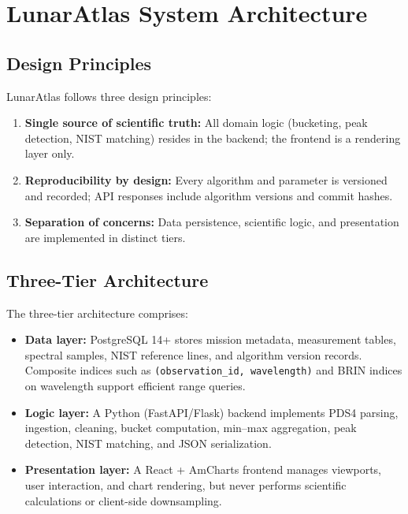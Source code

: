 \documentclass[12pt,a4paper]{article}
\begin{document}
\section{LunarAtlas System Architecture}
\label{sec:architecture}

\subsection{Design Principles}

LunarAtlas follows three design principles:

\begin{enumerate}[nosep]
  \item \textbf{Single source of scientific truth:} All domain logic (bucketing, peak detection, NIST matching) resides in the backend; the frontend is a rendering layer only.
  \item \textbf{Reproducibility by design:} Every algorithm and parameter is versioned and recorded; API responses include algorithm versions and commit hashes.
  \item \textbf{Separation of concerns:} Data persistence, scientific logic, and presentation are implemented in distinct tiers.
\end{enumerate}

\subsection{Three-Tier Architecture}

The three-tier architecture comprises:

\begin{itemize}[nosep]
  \item \textbf{Data layer:} PostgreSQL 14+ stores mission metadata, measurement tables, spectral samples, NIST reference lines, and algorithm version records. Composite indices such as \texttt{(observation\_id, wavelength)} and BRIN indices on wavelength support efficient range queries.
  \item \textbf{Logic layer:} A Python (FastAPI/Flask) backend implements PDS4 parsing, ingestion, cleaning, bucket computation, min--max aggregation, peak detection, NIST matching, and JSON serialization.
  \item \textbf{Presentation layer:} A React + AmCharts frontend manages viewports, user interaction, and chart rendering, but never performs scientific calculations or client-side downsampling.
\end{itemize}
\end{document}
